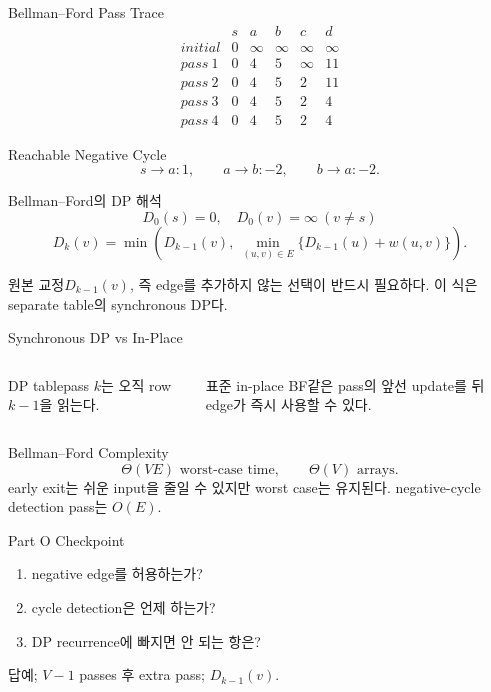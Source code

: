 \begin{frame}{Bellman--Ford Pass Trace}
\[
\begin{array}{c|rrrrr}&s&a&b&c&d\\\hline
initial&0&\infty&\infty&\infty&\infty\\
pass~1&0&4&5&\infty&11\\
pass~2&0&4&5&2&11\\
pass~3&0&4&5&2&4\\
pass~4&0&4&5&2&4
\end{array}
\]
\end{frame}
\begin{frame}{Reachable Negative Cycle}
\[
s\to a:1,\qquad a\to b:-2,\qquad b\to a:-2.
\]
\centering{}
\end{frame}
\begin{frame}{Bellman--Ford의 DP 해석}
\small\[
D_0(s)=0,\quad D_0(v)=\infty\ (v\ne s)
\]
\[
D_k(v)=\min\left(D_{k-1}(v),\ \min_{(u,v)\in E}\{D_{k-1}(u)+w(u,v)\}\right).
\]
\begin{alertblock}{원본 교정}\(D_{k-1}(v)\), 즉 edge를 추가하지 않는 선택이 반드시 필요하다. 이 식은 separate table의 synchronous DP다.\end{alertblock}
\end{frame}
\begin{frame}{Synchronous DP vs In-Place}
\begin{columns}[T]\begin{block}{DP table}pass \(k\)는 오직 row \(k-1\)을 읽는다.\end{block}
\begin{block}{표준 in-place BF}같은 pass의 앞선 update를 뒤 edge가 즉시 사용할 수 있다.\end{block}\end{columns}
\end{frame}
\begin{frame}{Bellman--Ford Complexity}
\[
\Theta(VE)\text{ worst-case time},\qquad \Theta(V)\text{ arrays}.
\]
early exit는 쉬운 input을 줄일 수 있지만 worst case는 유지된다. negative-cycle detection pass는 \(O(E)\).
\end{frame}
\begin{frame}{Part O Checkpoint}
\begin{enumerate}\item negative edge를 허용하는가?\item cycle detection은 언제 하는가?\item DP recurrence에 빠지면 안 되는 항은?\end{enumerate}
\begin{exampleblock}{답}예; \(V-1\) passes 후 extra pass; \(D_{k-1}(v)\).\end{exampleblock}
\end{frame}
